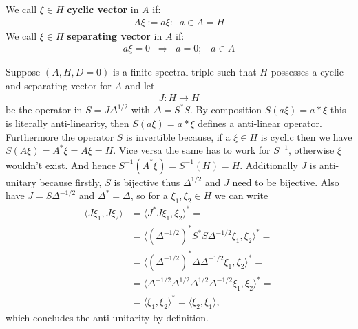 
\begin{mydefinition}
    We call $\xi \in H$ \textbf{cyclic vector} in $A$ if:
    \begin{align}
        A\xi := { a\xi:\;\; a\in A} = H
    \end{align}
    We call $\xi \in H$ \textbf{separating vector} in $A$ if:
    \begin{align}
        a\xi = 0\;\; \Rightarrow \;\; a=0;\;\;\; a\in A
    \end{align}
\end{mydefinition}
Suppose $(A, H, D = 0)$ is a finite spectral triple such that $H$ possesses a
cyclic and separating vector for $A$ and let
\begin{align}
    J: H \rightarrow H
\end{align}
be the operator in $S = J \Delta ^{1/2}$ with $\Delta = S^*S$. By composition
$S(a\xi) = a*\xi$ this is literally anti-linearity, then $S(a \xi) = a* \xi$
defines a anti-linear operator. Furthermore the operator $S$ is invertible
because, if a $\xi \in H$ is cyclic then we have $S(A\xi) = A^*\xi = A\xi =
H$. Vice versa the same has to work for $S^{-1}$, otherwise $\xi$ wouldn't
exist. And hence $S^{-1}(A^*\xi) = S^{-1}(H) = H$. Additionally $J$ is
anti-unitary because firstly, $S$ is bijective thus $\Delta ^{1/2}$ and $J$ need to be bijective.
Also have $J = S \Delta^{-1/2}$ and $\Delta^* = \Delta$, so for a $\xi _1 ,
\xi _2 \in H$ we can write
\begin{align}
    \langle J \xi _1 , J \xi _2 \rangle  &= \langle  J^*J\xi_1 , \xi_2\rangle ^* =\nonumber\\
    &= \langle (\Delta ^{-1/2})^* S^* S \Delta ^{-1/2} \xi_1, \xi_2\rangle ^* =\nonumber \\
    &= \langle (\Delta^{-1/2})^* \Delta \Delta^{-1/2} \xi_1, \xi_2\rangle ^* =\nonumber\\
    &= \langle \Delta^{-1/2} \Delta^{1/2}\Delta^{1/2} \Delta^{-1/2} \xi_1, \xi_2\rangle ^*
    =\nonumber\\
    &= \langle \xi _1, \xi_2\rangle ^* = \langle \xi_2 , \xi_1\rangle ,
\end{align}
which concludes the anti-unitarity by definition.
